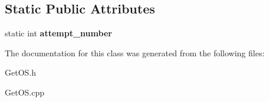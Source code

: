 \subsection*{Static Public Attributes}
\begin{DoxyCompactItemize}
\item 
\mbox{\label{classGetOS_aaf9248245d4223f4f55ce0f2fc9e0d6b}} 
static int {\bfseries attempt\+\_\+number}
\end{DoxyCompactItemize}


The documentation for this class was generated from the following files\+:\begin{DoxyCompactItemize}
\item 
Get\+O\+S.\+h\item 
Get\+O\+S.\+cpp\end{DoxyCompactItemize}
